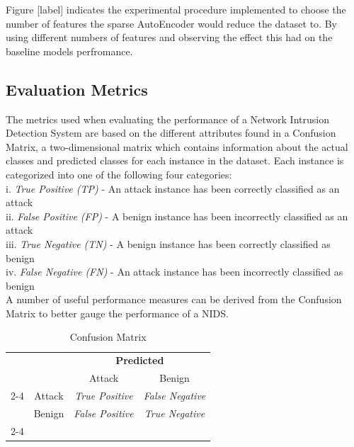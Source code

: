 \documentclass[conference]{IEEEtran}
\begin{document}
Figure [label] indicates the experimental procedure implemented to choose the number of features the sparse AutoEncoder would reduce the dataset to. By using different numbers of features and observing the effect this had on the baseline models perfromance. 

\subsection{Evaluation Metrics}
The metrics used when evaluating the performance of a Network Intrusion Detection System are based on the different attributes found in a Confusion Matrix, a two-dimensional matrix which contains information about the actual classes and predicted classes for each instance in the dataset. Each instance is categorized into one of the following four categories:\\

\noindent i. \emph{True Positive (TP)} - An attack instance has been correctly classified as an attack\\ 
ii. \emph{False Positive (FP)} - A benign instance has been incorrectly classified as an attack\\
iii. \emph{True Negative (TN)} - A benign instance has been correctly classified as benign \\
iv. \emph{False Negative (FN)} - An attack instance has been incorrectly classified as benign \\

\noindent A number of useful performance measures can be derived from the Confusion Matrix to better gauge the performance of a NIDS.

\begin{table}[htbp]
\caption{Confusion Matrix}
    \centering
    
\begin{tabular}{cc|cc}
\multicolumn{2}{c}{}
            &   \multicolumn{2}{c}{\textbf{Predicted}} \\
            
    &       &   Attack &   Benign              \\ 
    \cline{2-4}
\multirow{\rotatebox[origin=c]{90}{\textbf{Actual}}}
    & Attack   & \emph{True Positive}   & \emph{False Negative}                 \\
    & Benign    & \emph{False Positive}    & \emph{True Negative}                \\ 
    \cline{2-4}
\end{tabular}

    
    \label{tab:my_label}
\end{table}
\\
\end{document}
